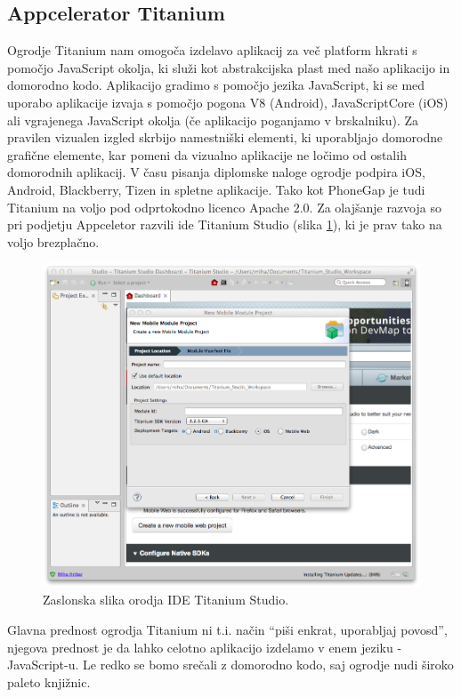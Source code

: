 \subsection{Appcelerator Titanium}

Ogrodje Titanium\cite{titanium} nam omogoča izdelavo aplikacij za več platform hkrati s pomočjo JavaScript okolja, ki služi kot abstrakcijska plast med našo aplikacijo in domorodno kodo. Aplikacijo gradimo s pomočjo jezika JavaScript, ki se med uporabo aplikacije izvaja s pomočjo pogona V8\cite{v8} (Android), JavaScriptCore (iOS)\cite{javascriptcore} ali vgrajenega JavaScript okolja (če aplikacijo poganjamo v brskalniku). Za pravilen vizualen izgled skrbijo namestniški elementi, ki uporabljajo domorodne grafične elemente, kar pomeni da vizualno aplikacije ne ločimo od ostalih domorodnih aplikacij. V času pisanja diplomske naloge ogrodje podpira iOS, Android, Blackberry, Tizen in spletne aplikacije. Tako kot PhoneGap je tudi Titanium na voljo pod odprtokodno licenco Apache 2.0. Za olajšanje razvoja so pri podjetju Appceletor razvili \gls{ide} Titanium Studio (slika \ref{fig:titanium-studio}), ki je prav tako na voljo brezplačno.

\begin{figure}
 \includegraphics[width=\linewidth]{titanium}
 \caption{Zaslonska slika orodja IDE Titanium Studio.}
 \label{fig:titanium-studio}
\end{figure}

Glavna prednost ogrodja Titanium ni t.i. način ``piši enkrat, uporabljaj povosd'', njegova prednost je da lahko celotno aplikacijo izdelamo v enem jeziku - JavaScript-u. Le redko se bomo srečali z domorodno kodo, saj ogrodje nudi široko paleto knjižnic.

